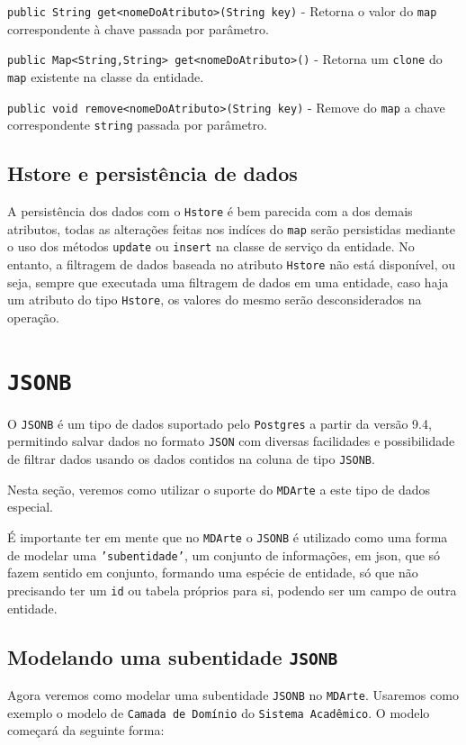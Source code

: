 \texttt{public String get<nomeDoAtributo>(String key)} - Retorna o valor do
\texttt{map} correspondente à chave passada por parâmetro.

\texttt{public Map<String,String> get<nomeDoAtributo>()} - Retorna um
\texttt{clone} do \texttt{map} existente na classe da entidade.

\texttt{public void remove<nomeDoAtributo>(String key)} - Remove do \texttt{map}
a chave correspondente \texttt{string} passada por parâmetro.

\subsection{Hstore e persistência de dados}
A persistência dos dados com o \texttt{Hstore} é bem parecida com a dos demais
atributos, todas as alterações feitas nos indíces do \texttt{map} serão
persistidas mediante o uso dos métodos \texttt{update} ou \texttt{insert} na 
classe de serviço da entidade. No entanto, a filtragem de dados baseada no
atributo \texttt{Hstore} não está disponível, ou seja, sempre que executada uma
filtragem de dados em uma entidade, caso haja um atributo do tipo
\texttt{Hstore}, os valores do mesmo serão desconsiderados na operação.

\section{\texttt{JSONB}}
O \texttt{JSONB} é um tipo de dados suportado pelo \texttt{Postgres} a partir da
versão 9.4, permitindo salvar dados no formato \texttt{JSON} com diversas
facilidades e possibilidade de filtrar dados usando os dados contidos na coluna
de tipo \texttt{JSONB}.

Nesta seção, veremos como utilizar o suporte do \texttt{MDArte} a este tipo de
dados especial. 

É importante ter em mente que no \texttt{MDArte} o \texttt{JSONB} é utilizado
como uma forma de modelar uma \texttt{'subentidade'}, um conjunto de
informações, em json, que só fazem sentido em conjunto, formando uma espécie de
entidade, só que não precisando ter um \texttt{id} ou tabela próprios para si,
podendo ser um campo de outra entidade.

\subsection{Modelando uma subentidade \texttt{JSONB}}
Agora veremos como modelar uma subentidade \texttt{JSONB} no \texttt{MDArte}.
Usaremos como exemplo o modelo de \texttt{Camada de Domínio} do \texttt{Sistema
Acadêmico}. O modelo começará da seguinte forma:

